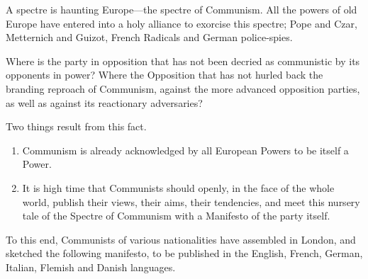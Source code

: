 A spectre is haunting Europe—the spectre of Communism. All the powers of old Europe have entered into a holy alliance to exorcise this spectre; Pope and Czar, Metternich and Guizot, French Radicals and German police-spies.

Where is the party in opposition that has not been decried as communistic by its opponents in power? Where the Opposition that has not hurled back the branding reproach of Communism, against the more advanced opposition parties, as well as against its reactionary adversaries?

Two things result from this fact.
\begin{enumerate}[label={\Roman*}.]
	\item Communism is already acknowledged by all European Powers to be itself a Power.
	\item It is high time that Communists should openly, in the face of the whole world, publish their views, their aims, their tendencies, and meet this nursery tale of the Spectre of Communism with a Manifesto of the party itself.
\end{enumerate}
To this end, Communists of various nationalities have assembled in London, and sketched the following manifesto, to be published in the English, French, German, Italian, Flemish and Danish languages.